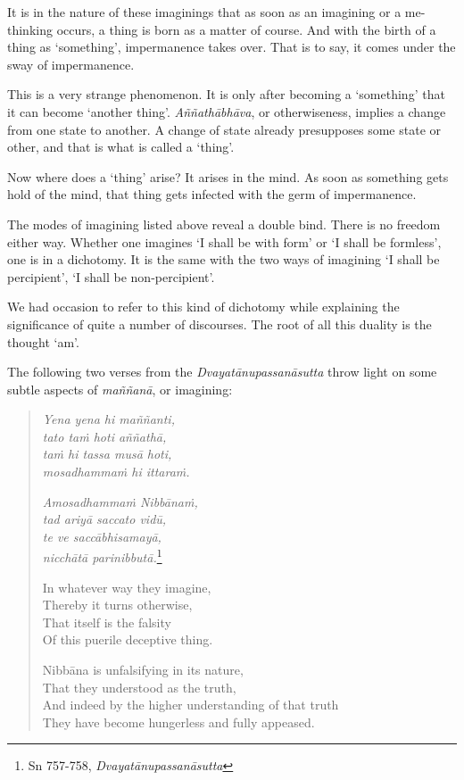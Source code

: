 It is in the nature of these imaginings that as soon as an imagining or a me-thinking occurs, a thing is born as a matter of course. And with the birth of a thing as `something', impermanence takes over. That is to say, it comes under the sway of impermanence.

This is a very strange phenomenon. It is only after becoming a `something' that it can become `another thing'. \emph{Aññathābhāva}, or otherwiseness, implies a change from one state to another. A change of state already presupposes some state or other, and that is what is called a `thing'.

Now where does a `thing' arise? It arises in the mind. As soon as something gets hold of the mind, that thing gets infected with the germ of impermanence.

The modes of imagining listed above reveal a double bind. There is no freedom either way. Whether one imagines `I shall be with form' or `I shall be formless', one is in a dichotomy. It is the same with the two ways of imagining `I shall be percipient', `I shall be non-percipient'.

We had occasion to refer to this kind of dichotomy while explaining the significance of quite a number of discourses. The root of all this duality is the thought `am'.

The following two verses from the \emph{Dvayatānupassanāsutta} throw light on some subtle aspects of \emph{maññanā}, or imagining:

\begin{quote}
\emph{Yena yena hi maññanti,}\\
\emph{tato taṁ hoti aññathā,}\\
\emph{taṁ hi tassa musā hoti,}\\
\emph{mosadhammaṁ hi ittaraṁ.}

\emph{Amosadhammaṁ Nibbānaṁ,}\\
\emph{tad ariyā saccato vidū,}\\
\emph{te ve saccābhisamayā,}\\
\emph{nicchātā parinibbutā.}\footnote{Sn 757-758, \emph{Dvayatānupassanāsutta}}

In whatever way they imagine,\\
Thereby it turns otherwise,\\
That itself is the falsity\\
Of this puerile deceptive thing.

Nibbāna is unfalsifying in its nature,\\
That they understood as the truth,\\
And indeed by the higher understanding of that truth\\
They have become hungerless and fully appeased.
\end{quote}

